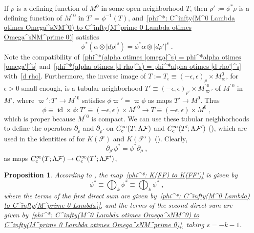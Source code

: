 \documentclass{memo-l}
\theoremstyle{plain}
\newtheorem{prop}[thm]{Proposition}
\theoremstyle{definition}
\theoremstyle{remark}
\newcommand{\FF}{\mathcal{F}}
\newcommand{\id}{\operatorname{id}}
\newcommand{\Cinftyc}{C^\infty_{\text{\rm c}}}
\numberwithin{section}{chapter}
\numberwithin{equation}{section}%
\begin{document}
If $\rho$ is a defining function of $M^0$ in some open neighborhood $T$, then $\rho':=\phi^*\rho$ is a defining function of $M^{\prime\,0}$ in $T'=\phi^{-1}(T)$, and~\eqref{phi^*: C^infty(M^0 Lambda otimes Omega^sNM^0) to C^infty(M^prime 0 Lambda otimes Omega^sNM^prime 0)} satisfies
\begin{equation}\label{phi^*(alpha otimes |d rho|^s) = phi^*alpha otimes |d rho'|^s}
\phi^*(\alpha\otimes|d\rho|^s)=\phi^*\alpha\otimes|d\rho'|^s\;.
\end{equation}
Note the compatibility of~\eqref{phi^*(alpha otimes |omega|^s) = phi^*alpha otimes |omega'|^s} and~\eqref{phi^*(alpha otimes |d rho|^s) = phi^*alpha otimes |d rho'|^s} with~\eqref{d rho}. Furthermore, the inverse image of $T:=T_\epsilon\equiv(-\epsilon,\epsilon)_\rho\times M^0_\varpi$, for $\epsilon>0$ small enough, is a tubular neighborhood $T'\equiv(-\epsilon,\epsilon)_{\rho'}\times M^{\prime\,0}_{\varpi'}$ of $M^{\prime\,0}$ in $M'$, where $\varpi':T'\to M^{\prime\,0}$ satisfies $\phi\varpi'=\varpi\phi$ as maps $T'\to M^0$. Thus
\[
\phi\equiv\id\times\phi:T'\equiv(-\epsilon,\epsilon)\times M^{\prime\,0}\to T\equiv(-\epsilon,\epsilon)\times M^0\;,
\]
which is proper because $M^{\prime\,0}$ is compact. We can use these tubular neighborhoods to define the operators $\partial_\rho$ and $\partial_{\rho'}$ on $\Cinftyc(T;\Lambda\FF)$ and $\Cinftyc(T';\Lambda\FF')$ (), which are used in the identities of  for $K(\FF)$ and $K(\FF')$ (). Clearly,
\begin{equation}\label{partial_rho' phi^* = phi^* partial_rho}
\partial_{\rho'}\phi^*=\phi^*\partial_\rho\;,
\end{equation}
as maps $\Cinftyc(T;\Lambda\FF)\to\Cinftyc(T';\Lambda\FF')$,

\begin{prop}\label{p: phi^* equiv bigoplus_k phi^*}
According to , the map~\eqref{phi^*: K(FF) to K(FF')} is given by
\[
\phi^*\equiv\bigoplus_k\phi^*\equiv\bigoplus_k\phi^*\;,
\]
where the terms of the first direct sum are given by~\eqref{phi^*: C^infty(M^0 Lambda) to C^infty(M^prime 0 Lambda)}, and the terms of the second direct sum are given by~\eqref{phi^*: C^infty(M^0 Lambda otimes Omega^sNM^0) to C^infty(M^prime 0 Lambda otimes Omega^sNM^prime 0)}, taking $s=-k-1$.
\end{prop}
\end{document}
